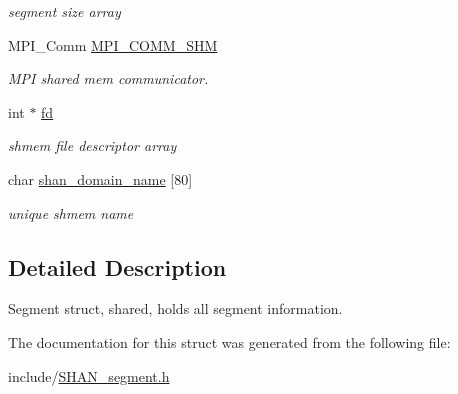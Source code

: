 \begin{DoxyCompactItemize}
\begin{DoxyCompactList}\small\item\em segment size array \end{DoxyCompactList}\item 
M\+P\+I\+\_\+\+Comm \hyperlink{structshan__segment__t_a0ef0eb1f9f3d377c39b54e847598e2d2}{M\+P\+I\+\_\+\+C\+O\+M\+M\+\_\+\+S\+HM}\hypertarget{structshan__segment__t_a0ef0eb1f9f3d377c39b54e847598e2d2}{}\label{structshan__segment__t_a0ef0eb1f9f3d377c39b54e847598e2d2}

\begin{DoxyCompactList}\small\item\em M\+PI shared mem communicator. \end{DoxyCompactList}\item 
int $\ast$ \hyperlink{structshan__segment__t_a66ac76e179662513f0b6d7fdad6f054d}{fd}\hypertarget{structshan__segment__t_a66ac76e179662513f0b6d7fdad6f054d}{}\label{structshan__segment__t_a66ac76e179662513f0b6d7fdad6f054d}

\begin{DoxyCompactList}\small\item\em shmem file descriptor array \end{DoxyCompactList}\item 
char \hyperlink{structshan__segment__t_aa5f870d8d68479790654e99c8eae5edd}{shan\+\_\+domain\+\_\+name} \mbox{[}80\mbox{]}\hypertarget{structshan__segment__t_aa5f870d8d68479790654e99c8eae5edd}{}\label{structshan__segment__t_aa5f870d8d68479790654e99c8eae5edd}

\begin{DoxyCompactList}\small\item\em unique shmem name \end{DoxyCompactList}\end{DoxyCompactItemize}


\subsection{Detailed Description}
Segment struct, shared, holds all segment information. 

The documentation for this struct was generated from the following file\+:\begin{DoxyCompactItemize}
\item 
include/\hyperlink{SHAN__segment_8h}{S\+H\+A\+N\+\_\+segment.\+h}\end{DoxyCompactItemize}
